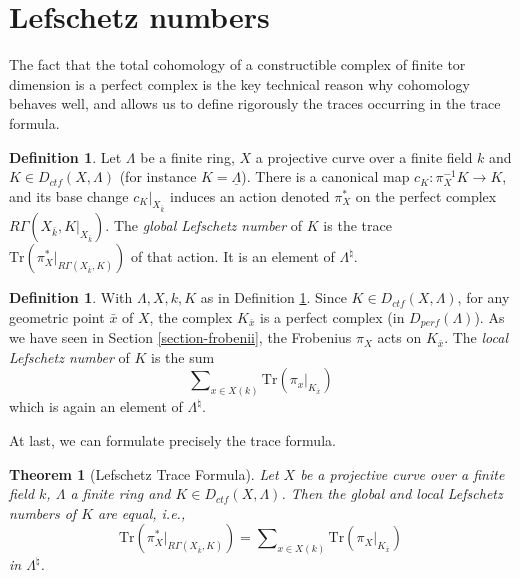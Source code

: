 \documentclass{stacks-project}
\theoremstyle{plain}
\newtheorem{theorem}[subsection]{Theorem}
\theoremstyle{definition}
\newtheorem{definition}[subsection]{Definition}
\theoremstyle{remark}
\numberwithin{equation}{subsection}
\begin{document}
\section{Lefschetz numbers}
\label{section-lefschetz-numbers}

\noindent
The fact that the total cohomology of a constructible complex of finite tor
dimension is a perfect complex is the key technical reason why cohomology
behaves well, and allows us to define rigorously the traces occurring in the
trace formula.

\begin{definition}
\label{definition-global-lefschetz-number}
Let $\Lambda$ be a finite ring, $X$ a projective curve over a finite field $k$
and $K \in D_{ctf}(X, \Lambda)$ (for instance $K = \underline\Lambda$).
There is a canonical map $c_K : \pi_X^{-1}K \to K$, and its base change
$c_K|_{X_{\bar k}}$ induces an action denoted $\pi_X^*$ on the perfect
complex $R\Gamma(X_{\bar k}, K|_{X_{\bar k}})$. The
{\it global Lefschetz number} of $K$ is the trace
$\text{Tr}(\pi_X^* |_{R\Gamma(X_{\bar k}, K)})$ of that action.
It is an element of $\Lambda^\natural$.
\end{definition}

\begin{definition}
\label{definition-local-lefschetz-number}
With $\Lambda, X, k, K$ as in
Definition \ref{definition-global-lefschetz-number}.
Since $K\in D_{ctf}(X, \Lambda)$, for any geometric point $\bar x$ of $X$,
the complex $K_{\bar x}$ is a perfect complex (in $D_{perf}(\Lambda)$). As we
have seen in Section \ref{section-frobenii}, the Frobenius $\pi_X$ acts on
$K_{\bar x}$. The {\it local Lefschetz number} of $K$ is the sum
$$
\sum\nolimits_{x\in X(k)} \text{Tr}(\pi_x |_{K_{\overline{x}}})
$$
which is again an element of $\Lambda^\natural$.
\end{definition}

\noindent
At last, we can formulate precisely the trace formula.

\begin{theorem}[Lefschetz Trace Formula]
\label{theorem-trace}
Let $X$ be a projective curve over a finite field $k$, $\Lambda$ a finite ring
and $K \in D_{ctf}(X, \Lambda)$. Then the global and local Lefschetz numbers
of $K$ are equal, i.e.,
\begin{equation}
\label{equation-trace-formula}
\text{Tr}(\pi^*_X |_{R\Gamma(X_{\bar k}, K)})
=
\sum\nolimits_{x\in X(k)} \text{Tr}(\pi_X |_{K_{\bar x}})
\end{equation}
in $\Lambda^\natural$.
\end{theorem}
\end{document}
